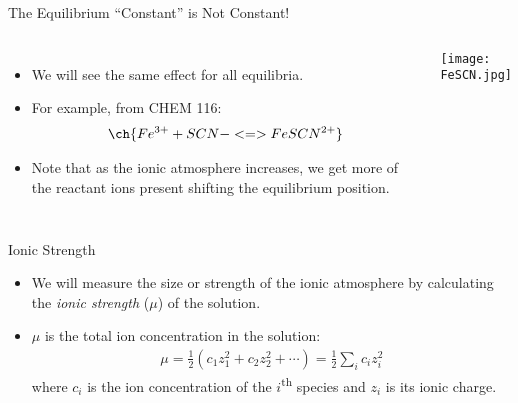 \documentclass[notes=onlyslideswithnotes,notes=hide]{beamer}
\begin{document}
\begin{frame}{The Equilibrium ``Constant'' is Not Constant!}
	\begin{columns}
		\begin{itemize}
			\item We will see the same effect for all equilibria.
			\item For example, from CHEM 116:
				\begin{align*}
					\ch{Fe^{3+} + SCN- <=> FeSCN^{2+}}
				\end{align*}
			\item Note that as the ionic atmosphere increases, we
				get more of the reactant ions present shifting
				the equilibrium position.
		\end{itemize}
		\texttt{[image: FeSCN.jpg]}
	\end{columns}
\end{frame}

\begin{frame}{Ionic Strength}
	\begin{itemize}
		\item We will measure the size or strength of the ionic
			atmosphere by calculating the \emph{ionic strength}
			($\mu$) of the solution.
		\item $\mu$ is the total ion concentration in the solution:
			\begin{align*}
				\mu = \frac{1}{2}(c_1z_1^2 + c_2z_2^2 + \cdots)
				= \frac{1}{2}\sum_{i}c_iz_i^2
			\end{align*}
			where $c_i$ is the ion concentration of the
			$i$\textsuperscript{th} species and $z_i$ is its ionic
			charge.
	\end{itemize}
\end{frame}
\end{document}
